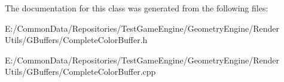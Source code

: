 The documentation for this class was generated from the following files\+:\begin{DoxyCompactItemize}
\item 
E\+:/\+Common\+Data/\+Repositories/\+Test\+Game\+Engine/\+Geometry\+Engine/\+Render Utils/\+G\+Buffers/Complete\+Color\+Buffer.\+h\item 
E\+:/\+Common\+Data/\+Repositories/\+Test\+Game\+Engine/\+Geometry\+Engine/\+Render Utils/\+G\+Buffers/Complete\+Color\+Buffer.\+cpp\end{DoxyCompactItemize}
